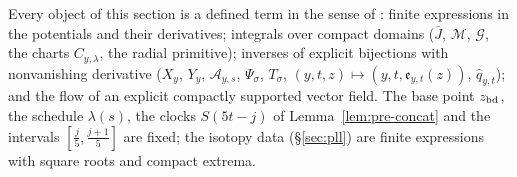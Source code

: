 \begin{remark}[Explicitness]\label{rem:pln-explicit}
Every object of this section is a defined term in the sense of : finite expressions in the
potentials and their derivatives; integrals over compact domains ($\bar J$, $\mathcal M$, $\mathcal G$, the charts
$C_{y,\lambda}$, the radial primitive); inverses of explicit bijections with nonvanishing derivative ($X_y$, $Y_y$,
$\mathcal A_{y,s}$, $\Psi_\sigma$, $T_\sigma$, $(y,t,z)\mapsto(y,t,\mathfrak e_{y,t}(z))$, $\hat q_{y,t}$); and the flow of an explicit compactly supported vector field. The base point
$z_{\rm bd}$, the schedule $\lambda(s)$, the clocks $S(5t-j)$ of Lemma~\ref{lem:pre-concat} and the intervals
$[\frac j5,\frac{j+1}5]$ are fixed; the isotopy data (\S\ref{sec:pll}) are finite expressions with square roots and compact extrema.
\end{remark}
